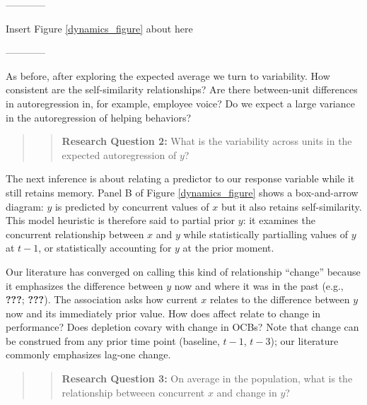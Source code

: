 \documentclass[english,,man]{apa6}
\begin{document}
\begin{center}

------------

Insert Figure \ref{dynamics_figure} about here

------------

\end{center}

As before, after exploring the expected average we turn to variability. How consistent are the self-similarity relationships? Are there between-unit differences in autoregression in, for example, employee voice? Do we expect a large variance in the autoregression of helping behaviors?

\begin{quote}
\begin{quote}
\textbf{Research Question 2:} What is the variability across units in the expected autoregression of \(y\)?
\end{quote}
\end{quote}

The next inference is about relating a predictor to our response variable while it still retains memory. Panel B of Figure \ref{dynamics_figure} shows a box-and-arrow diagram: \(y\) is predicted by concurrent values of \(x\) but it also retains self-similarity. This model heuristic is therefore said to partial prior \(y\): it examines the concurrent relationship between \(x\) and \(y\) while statistically partialling values of \(y\) at \(t - 1\), or statistically accounting for \(y\) at the prior moment.

Our literature has converged on calling this kind of relationship \enquote{change} because it emphasizes the difference between \(y\) now and where it was in the past (e.g., {\textbf{???}}; {\textbf{???}}). The association asks how current \(x\) relates to the difference between \(y\) now and its immediately prior value. How does affect relate to change in performance? Does depletion covary with change in OCBs? Note that change can be construed from any prior time point (baseline, \(t-1\), \(t-3\)); our literature commonly emphasizes lag-one change.

\begin{quote}
\begin{quote}
\textbf{Research Question 3:} On average in the population, what is the relationship betweeen concurrent \(x\) and change in \(y\)?
\end{quote}
\end{quote}
\end{document}
